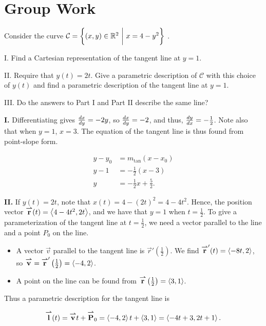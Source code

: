 \documentclass[noauthor]{ximera}
\begin{document}

\section{Group Work}

\begin{problem}
Consider the curve $\mathcal{C} = \left\{(x,y) \in \mathbb R^2 ~ \bigg| ~ x=4-y^2\right\}$ .

I. Find a Cartesian representation of the tangent line at $y=1$.

II. Require that $y(t) =2t$.  Give a parametric description of $\mathcal{C}$ with this choice of $y(t)$ and find a parametric description of the tangent line at  $y=1$. 

III. Do the answers to Part I and Part II describe the same line?


 \begin{freeResponse}
 \textbf{I.} Differentiating gives $\frac{\mathop{}\!d x}{\mathop{}\!d y} = -2y$, so $\frac{\mathop{}\!d x}{\mathop{}\!d y} = -2$, and thus, $\frac{\mathop{}\!d y}{\mathop{}\!d x} = -\frac{1}{2}$.  Note also that when $y=1$, $x=3$.  The equation of the tangent line is thus found from point-slope form.
 
 \begin{align*}
 y-y_0 &= m_{\tan}(x-x_0) \\
 y-1 &= -\frac{1}{2} (x-3) \\
 y &= -\frac{1}{2}x+\frac{5}{2}.
 \end{align*}
 
 \textbf{II.}  If $y(t)=2t$, note that $x(t) =4-(2t)^2 = 4-4t^2$.  Hence, the position vector ${\overset{\boldsymbol{\rightharpoonup}}{\mathbf{r}}}(t) = \left\langle 4-4t^2,2t\right\rangle$, and we have that $y=1$ when $t=\frac{1}{2}$.  To give a parameterization of the tangent line at $t=\frac{1}{2}$, we need a vector parallel to the line and a point $P_0$ on the line.
 
 \begin{itemize}
 \item A vector $\vec{v}$ parallel to the tangent line is $\vec{r}'\left(\frac{1}{2}\right)$. We find ${\overset{\boldsymbol{\rightharpoonup}}{\mathbf{r}}}'(t) = \left\langle -8t,2\right\rangle$, so ${\overset{\boldsymbol{\rightharpoonup}}{\mathbf{v}}} ={\overset{\boldsymbol{\rightharpoonup}}{\mathbf{r}}}'\left(\frac{1}{2}\right) =\left\langle -4,2\right\rangle$.
 \item A point on the line can be found from ${\overset{\boldsymbol{\rightharpoonup}}{\mathbf{r}}}\left(\frac{1}{2}\right) = \left\langle 3,1\right\rangle$.
 \end{itemize}
 
 Thus a parametric description for the tangent line is
 
 \[
 {\overset{\boldsymbol{\rightharpoonup}}{\mathbf{l}}}(t) = {\overset{\boldsymbol{\rightharpoonup}}{\mathbf{v}}}t+{\overset{\boldsymbol{\rightharpoonup}}{\mathbf{P}}}_0 = \left\langle -4,2\right\rangle t+ \left\langle 3,1\right\rangle = \left\langle -4t+3,2t+1\right\rangle.
 \]
 

\end{freeResponse}
\end{problem}
\end{document}
